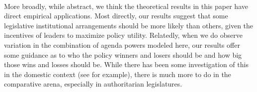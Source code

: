 \documentclass[12pt]{article}
\theoremstyle{plain}		      \newtheorem{assn}{Assumption}
\theoremstyle{plain}		      \newtheorem{prop}{Proposition}
\theoremstyle{plain}		      \newtheorem{lemma}{Lemma}
\theoremstyle{plain}	          \newtheorem{imp}{Implication}
\theoremstyle{plain}	          \newtheorem{hyp}{Hypothesis}
\theoremstyle{definition}		  \newtheorem{defn}{Definition}
\theoremstyle{remark}	          \newtheorem{rem}{Remark}
\theoremstyle{definition}         \newtheorem{case}{Case}
\begin{document}
\\
\indent More broadly, while abstract, we think the theoretical results in this paper have direct empirical applications. Most directly, our results suggest that some legislative institutional arrangements should be more likely than others, given the incentives of leaders to maximize policy utility. Relatedly, when we do observe variation in the combination of agenda powers modeled here, our results offer some guidance as to who the policy winners and losers should be and how big those wins and losses should be. While there has been some investigation of this in the domestic context (see \citet{carsonetal11} for example), there is much more to do in the comparative arena, especially in authoritarian legislatures.







%
%
\end{document}
